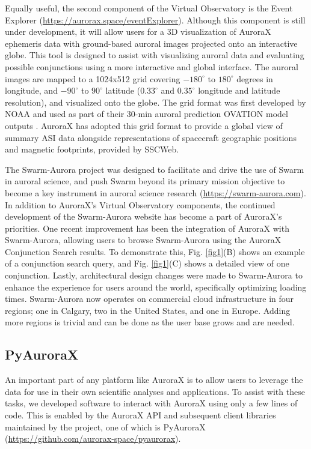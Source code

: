 \documentclass[utf8]{FrontiersinHarvard} %
\begin{document}
Equally useful, the second component of the Virtual Observatory is the Event Explorer (\url{https://aurorax.space/eventExplorer}). Although this component  is still under development, it will allow users for a 3D visualization of AuroraX ephemeris data with ground-based auroral images projected onto an interactive globe. This tool is designed to assist with visualizing auroral data and evaluating possible conjunctions using a more interactive and global interface. The auroral images are mapped to a 1024x512 grid covering $-180^\circ$ to $180^\circ$ degrees in longitude, and $-90^\circ$ to $90^\circ$ latitude ($0.33^\circ$ and $0.35^\circ$ longitude and latitude resolution), and visualized onto the globe. The grid format was first developed by NOAA and used as part of their 30-min auroral prediction OVATION model outputs \citep{Newell2010, Machol2012}. AuroraX has adopted this grid format to provide a global view of summary ASI data alongside representations of spacecraft geographic positions and magnetic footprints, provided by SSCWeb.

The Swarm-Aurora project was designed to facilitate and drive the use of Swarm in auroral science, and push Swarm beyond its primary mission objective to become a key instrument in auroral science research (\url{https://swarm-aurora.com}). In addition to AuroraX's Virtual Observatory components, the continued development of the Swarm-Aurora website has become a part of AuroraX’s priorities. One recent improvement has been the integration of AuroraX with Swarm-Aurora, allowing users to browse Swarm-Aurora using the AuroraX Conjunction Search results. To demonstrate this, Fig. \ref{fig1}(B) shows an example of a conjunction search query, and Fig. \ref{fig1}(C) shows a detailed view of one conjunction. Lastly, architectural design changes were made to Swarm-Aurora to enhance the experience for users around the world, specifically optimizing loading times. Swarm-Aurora now operates on commercial cloud infrastructure in four regions; one in Calgary, two in the United States, and one in Europe. Adding more regions is trivial and can be done as the user base grows and are needed.

\subsection{PyAuroraX}
An important part of any platform like AuroraX is to allow users to leverage the data for use in their own scientific analyses and applications. To assist with these tasks, we developed software to interact with AuroraX using only a few lines of code. This is enabled by the AuroraX API and subsequent client libraries maintained by the project, one of which is PyAuroraX (\url{https://github.com/aurorax-space/pyaurorax}).
\end{document}
